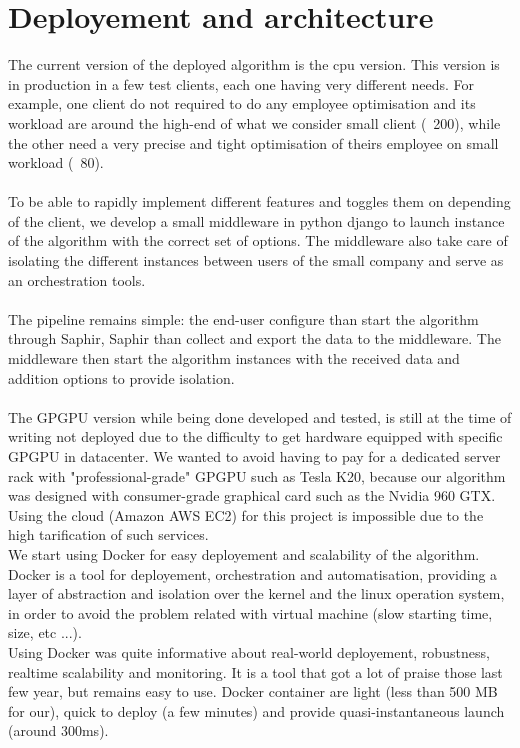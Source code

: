 \documentclass[12pt]{memoir}
\begin{document}
\section{Deployement and architecture}

The current version of the deployed algorithm is the cpu version. This version is in
production in a few test clients, each one having very different needs. For example,
one client do not required to do any employee optimisation and its workload are
around the high-end of what we consider small client (~200), while the other need a
very precise and tight optimisation of theirs employee on small workload (~80).\\
\\
To be able to rapidly implement different features and toggles them on depending of the client,
we develop a small middleware in python django to launch instance of the algorithm
with the correct set of options. The middleware also take care of isolating the
different instances between users of the small company and serve as an orchestration
tools.\\
\\
The pipeline remains simple: the end-user configure than start the algorithm through
Saphir, Saphir than collect and export the data to the middleware. The middleware
then start the algorithm instances with the received data and addition options to
provide isolation.\\
\\
The GPGPU version while being done developed and tested, is still at the time of
writing not deployed due to the difficulty to get hardware equipped with specific
GPGPU in datacenter. We wanted to avoid having to pay for a dedicated server rack
with "professional-grade" GPGPU such as Tesla K20, because our algorithm was
designed with consumer-grade graphical card such as the Nvidia 960 GTX. Using the
cloud (Amazon AWS EC2) for this project is impossible due to the high tarification
of such services.
\\
We start using Docker for easy deployement and scalability of the algorithm. Docker
is a tool for deployement, orchestration and automatisation, providing a layer of
abstraction and isolation over the kernel and the linux operation system, in order
to avoid the problem related with virtual machine (slow starting time, size, etc
...). \\
Using Docker was quite informative about real-world deployement, robustness,
realtime scalability and monitoring. It is a tool that got a lot of praise those
last few year, but remains easy to use. Docker container are light (less than 500
MB for our), quick to deploy (a few minutes) and provide quasi-instantaneous launch
(around 300ms).
\end{document}
